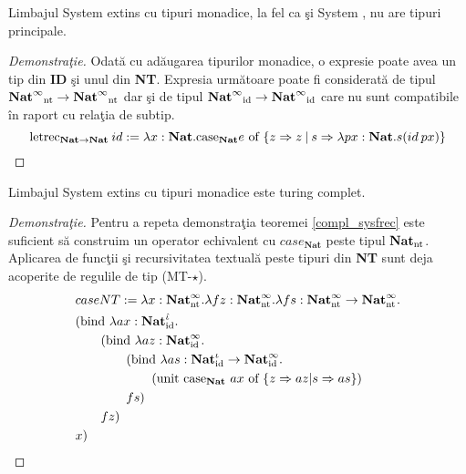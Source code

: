 \begin{proposition}
Limbajul System \fhat extins cu tipuri monadice, la fel ca \c si System \fhat, nu are tipuri principale.
\end{proposition}
\begin{proof}[Demonstra\c tie]
Odat\u a cu ad\u augarea tipurilor monadice, o expresie poate avea un tip din \textbf{ID} \c si unul din \textbf{NT}. Expresia urm\u atoare poate fi considerat\u a de tipul ${\textbf{Nat}^{\infty}}_{\text{nt}}\to{\textbf{Nat}^{\infty}}_{\text{nt}}$ dar \c si de tipul ${\textbf{Nat}^{\infty}}_{\text{id}}\to{\textbf{Nat}^{\infty}}_{\text{id}}$ care nu sunt compatibile \^ in raport cu rela\c tia de subtip.
\begin{equation*}
\text{letrec}_{\textbf{Nat}\to\textbf{Nat}}\: id := \lambda x : \textbf{Nat}. \text{case}_{\textbf{Nat}} e \text{ of } \{ z \Rightarrow z \:|\: s \Rightarrow \lambda px : {\textbf{Nat}}. s (id\hspace{2pt} px) \} \qedhere
\end{equation*}
\end{proof}
\begin{proposition}
Limbajul System \fhat extins cu tipuri monadice este turing complet.
\end{proposition}
\begin{proof}[Demonstra\c tie] \label{proof_ntcompl}
Pentru a repeta demonstra\c tia teoremei \ref{compl_sysfrec} este suficient s\u a construim un o\-pe\-ra\-tor echivalent cu $case_\textbf{Nat}$ peste tipul ${\textbf{Nat}}_{\text{nt}}$. Aplicarea de func\c tii \c si recursivitatea textual\u a peste tipuri din \textbf{NT} sunt deja acoperite de regulile de tip {\scriptsize (MT-$\star$)}.
\begin{align*}
& caseNT := \lambda x : {\textbf{Nat}}_{\text{nt}}^\infty. \lambda fz : {\textbf{Nat}}_{\text{nt}}^\infty. \lambda fs : {\textbf{Nat}}_{\text{nt}}^\infty\to {\textbf{Nat}}_{\text{nt}}^\infty.            \\
& (\text{bind } \lambda ax : {\textbf{Nat}}_{\text{id}}^{\hat{\iota}}.                                          \\
& \qquad (\text{bind } \lambda az : \textbf{Nat}_{\text{id}}^\infty.                                            \\
& \qquad \qquad (\text{bind } \lambda as : \textbf{Nat}_{\text{id}}^\iota \to \textbf{Nat}_{\text{id}}^\infty . \\
& \qquad \qquad \qquad (\text{unit case}_{\textbf{Nat}}\ ax \text{ of } \{ z \Rightarrow az | s \Rightarrow as \})     \\
& \qquad \qquad fs)                                                                                             \\
& \qquad fz)                                                                                                   \\
& x) \qedhere
\end{align*}
\end{proof}





